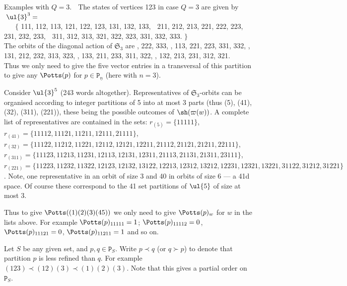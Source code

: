 \documentclass[reqno,10pt,a4paper]{amsart}
\newcommand{\Sym}{\mathfrak{S}}
\newcommand{\rmP}{{\mathtt P}} %
\newcommand{\Part}{\rmP}  %
\begin{document}
\mdef
Examples with $Q=3$. $\;$ 
The states of vertices 123 in case $Q=3$ are
given by
$\; \ul{3}^3 = $ 
\\  $\mbox{ }$  $\;$ \hspace{-.321in} 
$\{ \!\!\!\!$
{\tiny{ 
111, 112, 113, 121, 122, 123, 131, 132, 133, $\;$
211, 212, 213, 221, 222, 223, 231, 232, 233, $\;$ 
311, 312, 313, 321, 322, 323, 331, 332, 333. 
}}  $\!\!\!\!\!\!\}$
\\ 
The orbits of the diagonal action of $\Sym_3$ are , 222, 333, , 113, 221, 223, 331, 332, , 131, 212, 232, 313, 323, , 133, 211, 233, 311, 322, , 132, 213, 231, 312, 321.
\\
Thus we only need to give the five vector entries in a transversal of this partition to give any $\Potts(p)$ for $ p \in \Part_{\underline{n}}$
(here with $n=3$).  

Consider 
$\ul{3}^5$ (243 words altogether). 
Representatives of $\Sym_3$-orbits 
can be organised according to integer partitions of 5 into at most 3 parts
(thus (5), (41), (32), (311), (221)), %
these being the possible outcomes of $\sh(\varpi(w))$.
A complete list of representatives
are contained in the sets: 
$r_{(5)} = \{ 11111 \}$,  \qquad 
\( r_{(41)} =\{ 11112, 11121, 11211, 12111, 21111 \} \),  \qquad 
\\ 
\( r_{(32)} =\{ 11122, 11212, 11221, 12112, 12121, 12211, 21112, 21121, 21211, 22111 \} \), \qquad 
\\ 
\( r_{(311)} =\{ 11123, 11213, 11231, 12113, 12131, 12311, 21113, 21131, 21311, 23111 \} \), \qquad 
\\ 
\( r_{(221)} =\{ 11223, 11232, 11322, 12123, 12132, 13122, 12213, 12312, 13212, 
12231, 12321, 13221, 31122, 31212, 31221 \} \).
Note, one
representative 
in an orbit of size 3 and 40 in orbits of size 6 --- a 41d space.
Of course these correspond to the 41 set partitions of $\ul{5}$ of size at most 3.

Thus to give $\Potts((1)(2)(3)(45))$ we only need to give $\Potts(p)_w$
for $w$ in the lists above. For example 
$\Potts(p)_{11111} =1$; $\Potts(p)_{11112} =0$, 
$\Potts(p)_{11121} =0$, $\Potts(p)_{11211} =1$ and so on.  




\mdef 
Let $S$ be any given set, and $p,q \in \rmP_S$. 
Write $p \prec q$ 
(or $q \succ p$)
to denote that partition $p$ is less refined than $q$.
For example
$(123)\prec (12)(3) \prec (1)(2)(3)$.
Note that this gives a partial order on $\rmP_S$. %
\end{document}
